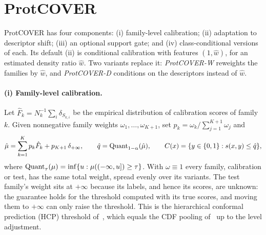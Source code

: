 \section{ProtCOVER}\label{sec:method}

ProtCOVER has four components: (i) family-level calibration; (ii) adaptation to descriptor shift; (iii) an optional support gate; and (iv) class-conditional versions of each. Its default (ii) is conditional calibration with features $(1,\hat w)$, for an estimated density ratio $\hat w$. Two variants replace it: \emph{ProtCOVER-W} reweights the families by $\hat w$, and \emph{ProtCOVER-D} conditions on the descriptors instead of $\hat w$.

\paragraph{(i) Family-level calibration.}
Let $\hat F_k=N_k^{-1}\sum_{i}\delta_{S_{k,i}}$ be the empirical distribution of calibration scores of family $k$. Given nonnegative family weights $\omega_1,\dots,\omega_{K+1}$, set $p_k=\omega_k/\sum_{j=1}^{K+1}\omega_j$ and
\begin{equation}\label{eq:threshold}
\hat\mu=\sum_{k=1}^{K}p_k\hat F_k+p_{K+1}\,\delta_{+\infty},\qquad
\hat q=\mathrm{Quant}_{1-\alpha}(\hat\mu),\qquad
C(x)=\{y\in\{0,1\}:s(x,y)\le\hat q\},
\end{equation}
where $\mathrm{Quant}_\tau(\mu)=\inf\{u:\mu((-\infty,u])\ge\tau\}$. With $\omega\equiv1$ every family, calibration or test, has the same total weight, spread evenly over its variants. The test family's weight sits at $+\infty$ because its labels, and hence its scores, are unknown: the guarantee holds for the threshold computed with its true scores, and moving them to $+\infty$ can only raise the threshold. This is the hierarchical conformal prediction (HCP) threshold of~\cite{lee2026hierarchical}, which equals the CDF pooling of~\cite{dunn2023distribution} up to the level adjustment.

